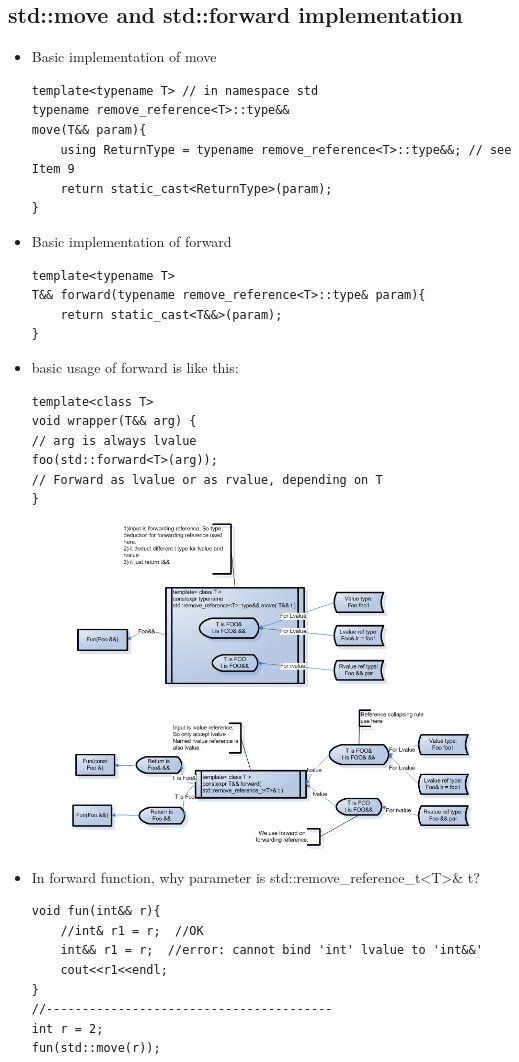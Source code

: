 \documentclass[a4paper,11pt,twoside]{book}
\begin{document}
\subsection{std::move and std::forward implementation}
\begin{itemize}
	\item Basic implementation of move
\begin{lstlisting}
template<typename T> // in namespace std
typename remove_reference<T>::type&&
move(T&& param){
	using ReturnType = typename remove_reference<T>::type&&; // see Item 9
	return static_cast<ReturnType>(param);
}
\end{lstlisting}
	
	\item Basic implementation of forward
\begin{lstlisting}
template<typename T>
T&& forward(typename remove_reference<T>::type& param){
	return static_cast<T&&>(param);
}
\end{lstlisting}

	\item basic usage of forward is like this:
\begin{lstlisting}
template<class T>
void wrapper(T&& arg) {
// arg is always lvalue
foo(std::forward<T>(arg)); 
// Forward as lvalue or as rvalue, depending on T
}
\end{lstlisting}
	\begin{figure}
		\centering
		\includegraphics[width=0.8\linewidth]{pics/rvalue_ref.png}
		\caption{}
		\label{fig:rvalueref}
	\end{figure}

	\item In forward function, why parameter is std::remove\_reference\_t<T>\& t?
\begin{lstlisting}
void fun(int&& r){
	//int& r1 = r;  //OK
	int&& r1 = r;  //error: cannot bind 'int' lvalue to 'int&&'
	cout<<r1<<endl;
}
//----------------------------------------
int r = 2;
fun(std::move(r));
\end{lstlisting}
\end{itemize}
\end{document}
